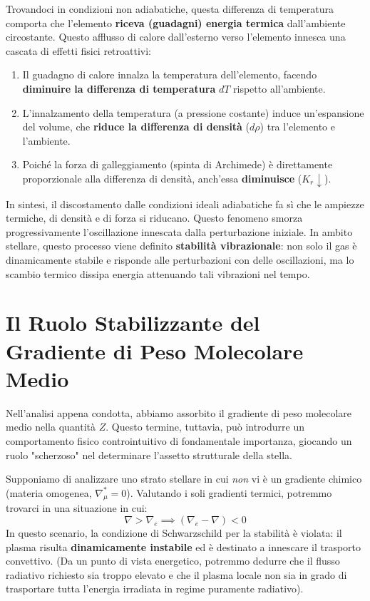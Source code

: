 Trovandoci in condizioni non adiabatiche, questa differenza di temperatura comporta che l'elemento \textbf{riceva (guadagni) energia termica} dall'ambiente circostante.
Questo afflusso di calore dall'esterno verso l'elemento innesca una cascata di effetti fisici retroattivi:
\begin{enumerate}
\item Il guadagno di calore innalza la temperatura dell'elemento, facendo \textbf{diminuire la differenza di temperatura} $dT$ rispetto all'ambiente.
\item L'innalzamento della temperatura (a pressione costante) induce un'espansione del volume, che \textbf{riduce la differenza di densità} ($d\rho$) tra l'elemento e l'ambiente.
\item Poiché la forza di galleggiamento (spinta di Archimede) è direttamente proporzionale alla differenza di densità, anch'essa \textbf{diminuisce} ($K_r \downarrow$).
\end{enumerate}

In sintesi, il discostamento dalle condizioni ideali adiabatiche fa sì che le ampiezze termiche, di densità e di forza si riducano. Questo fenomeno smorza progressivamente l'oscillazione innescata dalla perturbazione iniziale. In ambito stellare, questo processo viene definito \textbf{stabilità vibrazionale}: non solo il gas è dinamicamente stabile e risponde alle perturbazioni con delle oscillazioni, ma lo scambio termico dissipa energia attenuando tali vibrazioni nel tempo.

\section{Il Ruolo Stabilizzante del Gradiente di Peso Molecolare Medio}

Nell'analisi appena condotta, abbiamo assorbito il gradiente di peso molecolare medio nella quantità $Z$. Questo termine, tuttavia, può introdurre un comportamento fisico controintuitivo di fondamentale importanza, giocando un ruolo "scherzoso" nel determinare l'assetto strutturale della stella.

Supponiamo di analizzare uno strato stellare in cui \textit{non} vi è un gradiente chimico (materia omogenea, $\nabla_\mu^* = 0$). Valutando i soli gradienti termici, potremmo trovarci in una situazione in cui:
\begin{equation}
\nabla > \nabla_e \implies \left(\nabla_e - \nabla\right) < 0
\end{equation}
In questo scenario, la condizione di Schwarzschild per la stabilità è violata: il plasma risulta \textbf{dinamicamente instabile} ed è destinato a innescare il trasporto convettivo. (Da un punto di vista energetico, potremmo dedurre che il flusso radiativo richiesto sia troppo elevato e che il plasma locale non sia in grado di trasportare tutta l'energia irradiata in regime puramente radiativo).


